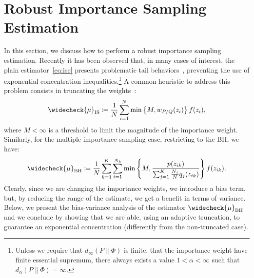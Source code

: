 \documentclass{article}
\begin{document}
\section{Robust Importance Sampling Estimation}\label{sec:robust}
In this section, we discuss how to perform a robust importance sampling estimation. Recently it has been observed that, in many cases of interest, the plain estimator~\eqref{eq:ise} presents problematic tail behaviors~\cite{metelli2018policy}, preventing the use of exponential concentration inequalities.\footnote{Unless we require that $d_{\infty}(P \| \Phi)$ is finite, \ie that the importance weight have finite essential supremum, there always exists a value $1<\alpha<\infty$ such that $d_{\alpha}(P \| \Phi)=\infty$.} A common heuristic to address this problem consists in truncating the weights~\cite{ionides2008truncated}:
\begin{align}\label{eq:truncatedise}
	\widecheck{\mu}_{\text{IS}} \coloneqq \frac{1}{N}\sum_{i=1}^{N} \min \left\{ M, {w}_{P/Q}(z_i) \right\} f(z_i),
\end{align}
where 
$M < \infty$ is a threshold to limit the magnitude of the importance weight. Similarly, for the multiple importance sampling case, restricting to the BH, we have:
\begin{align}\label{eq:truncatedmise}
	\widecheck{\mu}_{\text{BH}} \coloneqq \frac{1}{N} \sum_{k=1}^K\sum_{i=1}^{N_k} \min \left\{M,  \frac{p(z_{ik})}{\sum_{j=1}^K \frac{N_j}{N} q_j(z_{ik})} \right\} f(z_{ik}).
\end{align}
Clearly, since we are changing the importance weights, we introduce a bias term, but, by reducing the range of the estimate, we get a benefit in terms of variance. Below, we present the bias-variance analysis of the estimator $\widecheck{\mu}_{\text{BH}}$ and we conclude by showing that we are able, using an adaptive truncation, to guarantee an exponential concentration (differently from the non-truncated case).
\end{document}
